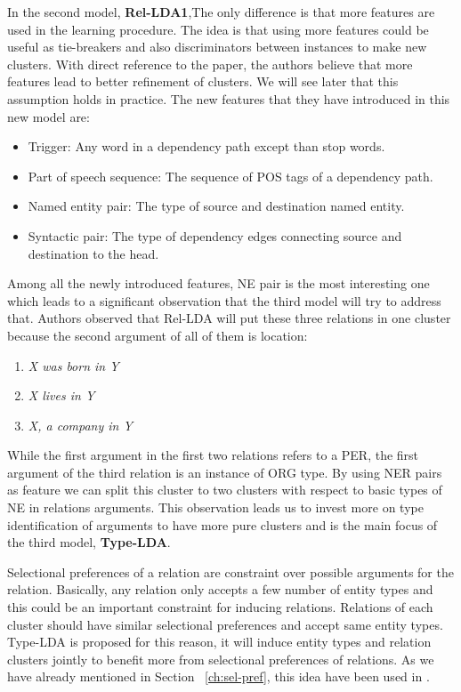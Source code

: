 \documentclass[12pt]{report}
\begin{document}
   	In the second model, \textbf{Rel-LDA1},The only difference is that  more features are used in the learning procedure.
   	 The idea is that using more features could be useful as tie-breakers and also discriminators between instances
   	  to make new clusters. With direct reference to the paper, the authors believe that more features 
   	  lead to better refinement of clusters. We will see later that this assumption holds in practice.
   	   The new features that they have introduced in this new model are:
   	   \begin{itemize}
   	     \item Trigger: Any word in a dependency path except than stop words. 
   	     \item Part of speech sequence: The sequence of POS tags of a dependency path. 
   	     \item Named entity pair: The type of source and destination named entity.
   	     \item Syntactic pair: The type of dependency edges connecting source and destination to the head.
   	   \end{itemize}   
   
 Among all the newly introduced features, NE pair is the most interesting one which leads to a 
 significant observation that the third model will try to address that. Authors observed that 
 Rel-LDA will put these three relations in one cluster because the second argument of all of them is location:
 
 \begin{enumerate}
   \item \emph{ X was born in Y}
   \item \emph{ X lives in Y}
   \item \emph{ X, a company in Y}
 \end{enumerate}
 
 While the first argument in the first two relations refers to a PER, the first argument of the 
 third relation is an instance of ORG type. By using NER pairs as feature we can split this cluster 
 to two clusters with respect to basic types of NE in relations arguments. 
 This observation leads us to invest more on type identification of arguments to have more pure 
 clusters and is the main focus of the third model, \textbf{Type-LDA}.
 
 
 Selectional preferences of a relation are constraint over possible arguments for the relation.
  Basically, any relation only accepts a few number of entity types and this could be an important constraint
   for inducing relations. Relations of each cluster should have similar selectional preferences and
    accept same entity types. Type-LDA is proposed for this reason, it will induce entity types 
    and relation clusters jointly to benefit more from selectional preferences of relations. 
    As we have already mentioned in Section ~\ref{ch:sel-pref},
     this idea have been used in \cite{Pantel2007} .
    
\end{document}
